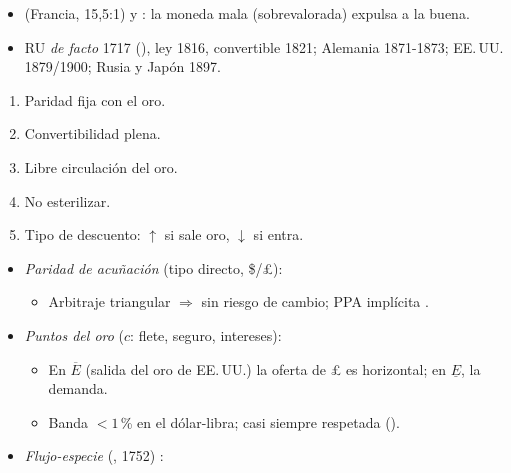 \documentclass{article}
\begin{document}
\begin{columnas}
\begin{itemize}
\item {} (Francia, 15,5:1) y : la moneda mala (sobrevalorada) expulsa a la buena.
\item RU \emph{de facto} 1717 (), ley 1816, convertible 1821; Alemania 1871-1873; EE.\,UU. 1879/1900; Rusia y Japón 1897.
\end{itemize}
\begin{enumerate}
\item Paridad fija con el oro.
\item Convertibilidad plena.
\item Libre circulación del oro.
\item No esterilizar.
\item Tipo de descuento: $\uparrow$ si sale oro, $\downarrow$ si entra.
\end{enumerate}
\begin{itemize}
\item \emph{Paridad de acuñación} (tipo directo, \$/\pounds):
  \begin{itemize}
  \item Arbitraje triangular $\Rightarrow$ sin riesgo de cambio; PPA implícita .
  \end{itemize}
\item \emph{Puntos del oro} ($c$: flete, seguro, intereses):
  \begin{itemize}
  \item En $\overline E$ (salida del oro de EE.\,UU.) la oferta de \pounds{} es horizontal; en $\underline E$, la demanda.
  \item Banda $<1$\,\% en el dólar-libra; casi siempre respetada ().
  \end{itemize}
\end{itemize}
\begin{itemize}
\item \emph{Flujo-especie} (, 1752) :

\end{itemize}
\end{columnas}
\end{document}
